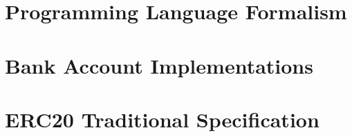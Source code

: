 \documentclass[acmsmall]{acmart}
\begin{document}










\newpage
\appendix

\section{Programming Language Formalism}
\label{app:LangOO}


\clearpage

%


\section{Bank Account Implementations}
\label{Bank:appendix}


\clearpage

\section{ERC20 Traditional Specification}
\label{sect:ERC20:appendix}

\clearpage

%

%   
%  
\end{document}
